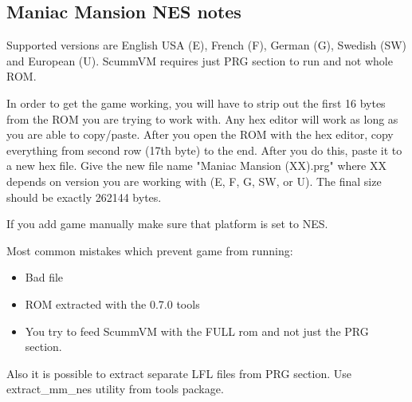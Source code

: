 \subsection{Maniac Mansion NES notes}
Supported versions are English USA (E), French (F), German (G), Swedish (SW)
and European (U). ScummVM requires just PRG section to run and not whole ROM.

In order to get the game working, you will have to strip out the first
16 bytes from the ROM you are trying to work with. Any hex editor will work
as long as you are able to copy/paste.  After you open the ROM with the
hex editor, copy everything from second row (17th byte) to the end. After
you do this, paste it to a new hex file. Give the new file name
"Maniac Mansion (XX).prg" where XX depends on version you are  working
with (E, F, G, SW, or U).  The final size should be exactly 262144 bytes.

If you add game manually make sure that platform is set to NES.

Most common mistakes which prevent game from running:

\begin{itemize}
  \item Bad file
  \item ROM extracted with the 0.7.0 tools
  \item You try to feed ScummVM with the FULL rom and not just the PRG section.
\end{itemize}

Also it is possible to extract separate LFL files from PRG section. Use
extract\_mm\_nes utility from tools package.
